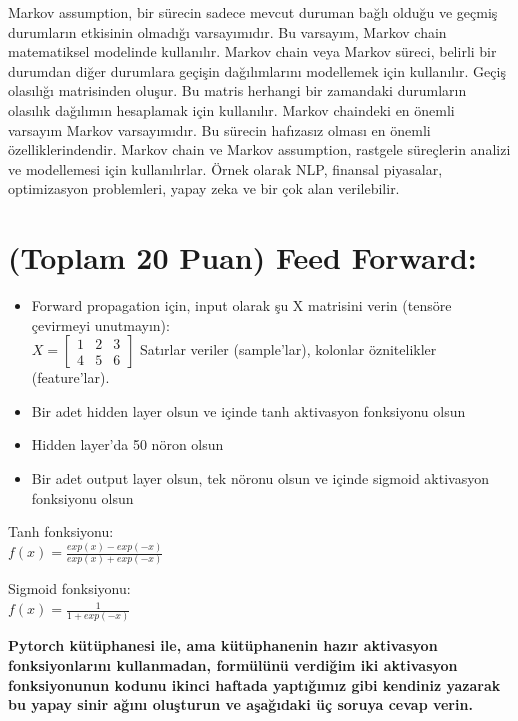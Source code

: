 \documentclass[11pt]{article}
\begin{document}
Markov assumption, bir sürecin sadece mevcut duruman bağlı olduğu ve geçmiş durumların etkisinin olmadığı varsayımıdır. Bu varsayım, Markov chain matematiksel modelinde kullanılır. 
Markov chain veya Markov süreci, belirli bir durumdan diğer durumlara geçişin dağılımlarını modellemek için kullanılır. Geçiş olasılığı matrisinden oluşur. Bu matris herhangi bir zamandaki durumların olasılık dağılımın hesaplamak için kullanılır. Markov chaindeki en önemli varsayım Markov varsayımıdır. Bu sürecin hafızasız olması en önemli özelliklerindendir. 
Markov chain ve Markov assumption, rastgele süreçlerin analizi ve modellemesi için kullanılırlar. Örnek olarak NLP, finansal piyasalar, optimizasyon problemleri, yapay zeka ve bir çok alan verilebilir. 


\section{(Toplam 20 Puan) Feed Forward:}
 
\begin{itemize}
    \item Forward propagation için, input olarak şu X matrisini verin (tensöre çevirmeyi unutmayın):\\
    $X = \begin{bmatrix}
        1 & 2 & 3\\
        4 & 5 & 6
        \end{bmatrix}$
    Satırlar veriler (sample'lar), kolonlar öznitelikler (feature'lar).
    \item Bir adet hidden layer olsun ve içinde tanh aktivasyon fonksiyonu olsun
    \item Hidden layer'da 50 nöron olsun
    \item Bir adet output layer olsun, tek nöronu olsun ve içinde sigmoid aktivasyon fonksiyonu olsun
\end{itemize}

Tanh fonksiyonu:\\
$f(x) = \frac{exp(x) - exp(-x)}{exp(x) + exp(-x)}$
\vspace{.2in}

Sigmoid fonksiyonu:\\
$f(x) = \frac{1}{1 + exp(-x)}$

\vspace{.2in}
 \textbf{Pytorch kütüphanesi ile, ama kütüphanenin hazır aktivasyon fonksiyonlarını kullanmadan, formülünü verdiğim iki aktivasyon fonksiyonunun kodunu ikinci haftada yaptığımız gibi kendiniz yazarak bu yapay sinir ağını oluşturun ve aşağıdaki üç soruya cevap verin.}
 
\end{document}
